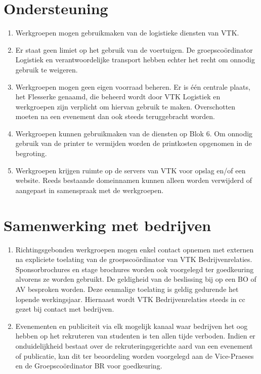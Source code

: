 \section{Ondersteuning}
\begin{enumerate}
    \item Werkgroepen mogen gebruikmaken van de logistieke diensten van VTK. 
    \item Er staat geen limiet op het gebruik van de voertuigen. De groepsco\"ordinator Logistiek en verantwoordelijke transport hebben echter het recht om onnodig gebruik te weigeren.
    \item Werkgroepen mogen geen eigen voorraad beheren. Er is één centrale plaats, het Flesserke genaamd, die beheerd wordt door VTK Logistiek en werkgroepen zijn verplicht om hiervan gebruik te maken. Overschotten moeten na een evenement dan ook steeds teruggebracht worden.
    \item Werkgroepen kunnen gebruikmaken van de diensten op Blok 6. Om onnodig gebruik van de printer te vermijden worden de printkosten opgenomen in de begroting. 
    \item Werkgroepen krijgen ruimte op de servers van VTK voor opslag en/of een website. Reeds bestaande domeinnamen kunnen alleen worden verwijderd of aangepast in samenspraak met de werkgroepen.
\end{enumerate}

\section{Samenwerking met bedrijven}
\begin{enumerate}
    \item  Richtingsgebonden werkgroepen mogen enkel contact opnemen met externen na expliciete toelating van de groepscoördinator van VTK Bedrijvenrelaties. Sponsorbrochures en stage brochures worden ook voorgelegd ter goedkeuring alvorens ze worden gebruikt. De geldigheid van de beslissing bij op een BO of AV besproken worden. Deze eenmalige toelating is geldig gedurende het lopende werkingsjaar. Hiernaast wordt VTK Bedrijvenrelaties steeds in cc gezet bij contact met bedrijven.
    \item Evenementen en publiciteit via elk mogelijk kanaal waar bedrijven het oog hebben op het rekruteren van studenten is ten allen tijde verboden. Indien er onduidelijkheid bestaat over de rekruteringsgerichte aard van een evenement of publicatie, kan dit ter beoordeling worden voorgelegd aan de Vice-Praeses en de Groepscoördinator BR voor goedkeuring.
\end{enumerate}

